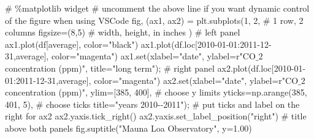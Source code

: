 \documentclass[
  letterpaper,
  DIV=11,
  numbers=noendperiod]{scrreprt}
\newenvironment{Shaded}{\begin{snugshade}}{\end{snugshade}}
\newcommand{\BuiltInTok}[1]{\textcolor[rgb]{0.00,0.23,0.31}{#1}}
\newcommand{\CommentTok}[1]{\textcolor[rgb]{0.37,0.37,0.37}{#1}}
\newcommand{\DecValTok}[1]{\textcolor[rgb]{0.68,0.00,0.00}{#1}}
\newcommand{\FloatTok}[1]{\textcolor[rgb]{0.68,0.00,0.00}{#1}}
\newcommand{\NormalTok}[1]{\textcolor[rgb]{0.00,0.23,0.31}{#1}}
\newcommand{\OperatorTok}[1]{\textcolor[rgb]{0.37,0.37,0.37}{#1}}
\newcommand{\StringTok}[1]{\textcolor[rgb]{0.13,0.47,0.30}{#1}}
\newcommand{\VerbatimStringTok}[1]{\textcolor[rgb]{0.13,0.47,0.30}{#1}}
\begin{document}
\begin{Shaded}
\begin{Highlighting}[]
\CommentTok{\# \%matplotlib widget}
\CommentTok{\# uncomment the above line if you want dynamic control of the figure when using VSCode}
\NormalTok{fig, (ax1, ax2) }\OperatorTok{=}\NormalTok{ plt.subplots(}\DecValTok{1}\NormalTok{, }\DecValTok{2}\NormalTok{,  }\CommentTok{\# 1 row, 2 columns}
\NormalTok{                               figsize}\OperatorTok{=}\NormalTok{(}\DecValTok{8}\NormalTok{,}\DecValTok{5}\NormalTok{)  }\CommentTok{\# width, height, in inches}
\NormalTok{                               )}
\CommentTok{\# left panel}
\NormalTok{ax1.plot(df[}\StringTok{\textquotesingle{}average\textquotesingle{}}\NormalTok{], color}\OperatorTok{=}\StringTok{"black"}\NormalTok{)}
\NormalTok{ax1.plot(df.loc[}\StringTok{\textquotesingle{}2010{-}01{-}01\textquotesingle{}}\NormalTok{:}\StringTok{\textquotesingle{}2011{-}12{-}31\textquotesingle{}}\NormalTok{,}\StringTok{\textquotesingle{}average\textquotesingle{}}\NormalTok{], color}\OperatorTok{=}\StringTok{"magenta"}\NormalTok{)}
\NormalTok{ax1.}\BuiltInTok{set}\NormalTok{(xlabel}\OperatorTok{=}\StringTok{"date"}\NormalTok{,}
\NormalTok{       ylabel}\OperatorTok{=}\VerbatimStringTok{r"CO$\_2$ concentration (ppm)"}\NormalTok{,}
\NormalTok{       title}\OperatorTok{=}\StringTok{"long term"}\NormalTok{)}\OperatorTok{;}
\CommentTok{\# right panel}
\NormalTok{ax2.plot(df.loc[}\StringTok{\textquotesingle{}2010{-}01{-}01\textquotesingle{}}\NormalTok{:}\StringTok{\textquotesingle{}2011{-}12{-}31\textquotesingle{}}\NormalTok{,}\StringTok{\textquotesingle{}average\textquotesingle{}}\NormalTok{], color}\OperatorTok{=}\StringTok{"magenta"}\NormalTok{)}
\NormalTok{ax2.}\BuiltInTok{set}\NormalTok{(xlabel}\OperatorTok{=}\StringTok{"date"}\NormalTok{,}
\NormalTok{        ylabel}\OperatorTok{=}\VerbatimStringTok{r"CO$\_2$ concentration (ppm)"}\NormalTok{,}
\NormalTok{        ylim}\OperatorTok{=}\NormalTok{[}\DecValTok{385}\NormalTok{, }\DecValTok{400}\NormalTok{],  }\CommentTok{\# choose y limits}
\NormalTok{        yticks}\OperatorTok{=}\NormalTok{np.arange(}\DecValTok{385}\NormalTok{, }\DecValTok{401}\NormalTok{, }\DecValTok{5}\NormalTok{),  }\CommentTok{\# choose ticks}
\NormalTok{        title}\OperatorTok{=}\StringTok{"years 2010{-}{-}2011"}\NormalTok{)}\OperatorTok{;}
\CommentTok{\# put ticks and label on the right for ax2}
\NormalTok{ax2.yaxis.tick\_right()}
\NormalTok{ax2.yaxis.set\_label\_position(}\StringTok{"right"}\NormalTok{)}
\CommentTok{\# title above both panels}
\NormalTok{fig.suptitle(}\StringTok{"Mauna Loa Observatory"}\NormalTok{, y}\OperatorTok{=}\FloatTok{1.00}\NormalTok{)}


\end{Highlighting}
\end{Shaded}
\end{document}

